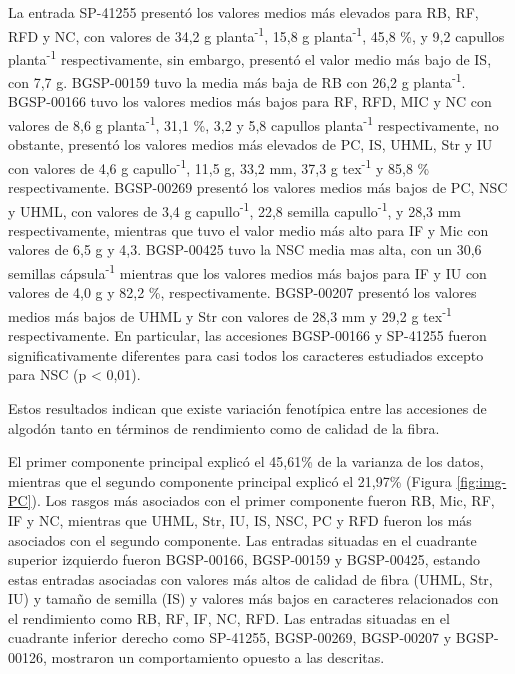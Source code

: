 \documentclass[12pt,oneside]{reedthesis}
\begin{document}
La entrada SP-41255 presentó los valores medios más elevados para RB, RF, RFD y NC, con valores de 34,2 g planta\textsuperscript{-1}, 15,8 g planta\textsuperscript{-1}, 45,8 \%, y 9,2 capullos planta\textsuperscript{-1} respectivamente, sin embargo, presentó el valor medio más bajo de IS, con 7,7 g. BGSP-00159 tuvo la media más baja de RB con 26,2 g planta\textsuperscript{-1}. BGSP-00166 tuvo los valores medios más bajos para RF, RFD, MIC y NC con valores de 8,6 g planta\textsuperscript{-1}, 31,1 \%, 3,2 y 5,8 capullos planta\textsuperscript{-1} respectivamente, no obstante, presentó los valores medios más elevados de PC, IS, UHML, Str y IU con valores de 4,6 g capullo\textsuperscript{-1}, 11,5 g, 33,2 mm, 37,3 g tex\textsuperscript{-1} y 85,8 \% respectivamente. BGSP-00269 presentó los valores medios más bajos de PC, NSC y UHML, con valores de 3,4 g capullo\textsuperscript{-1}, 22,8 semilla capullo\textsuperscript{-1}, y 28,3 mm respectivamente, mientras que tuvo el valor medio más alto para IF y Mic con valores de 6,5 g y 4,3. BGSP-00425 tuvo la NSC media mas alta, con un 30,6 semillas cápsula\textsuperscript{-1} mientras que los valores medios más bajos para IF y IU con valores de 4,0 g y 82,2 \%, respectivamente. BGSP-00207 presentó los valores medios más bajos de UHML y Str con valores de 28,3 mm y 29,2 g tex\textsuperscript{-1} respectivamente. En particular, las accesiones BGSP-00166 y SP-41255 fueron significativamente diferentes para casi todos los caracteres estudiados excepto para NSC (p \textless{} 0,01).

Estos resultados indican que existe variación fenotípica entre las accesiones de algodón tanto en términos de rendimiento como de calidad de la fibra.

El primer componente principal explicó el 45,61\% de la varianza de los datos, mientras que el segundo componente principal explicó el 21,97\% (Figura \ref{fig:img-PC}). Los rasgos más asociados con el primer componente fueron RB, Mic, RF, IF y NC, mientras que UHML, Str, IU, IS, NSC, PC y RFD fueron los más asociados con el segundo componente. Las entradas situadas en el cuadrante superior izquierdo fueron BGSP-00166, BGSP-00159 y BGSP-00425, estando estas entradas asociadas con valores más altos de calidad de fibra (UHML, Str, IU) y tamaño de semilla (IS) y valores más bajos en caracteres relacionados con el rendimiento como RB, RF, IF, NC, RFD. Las entradas situadas en el cuadrante inferior derecho como SP-41255, BGSP-00269, BGSP-00207 y BGSP-00126, mostraron un comportamiento opuesto a las descritas.
\end{document}
